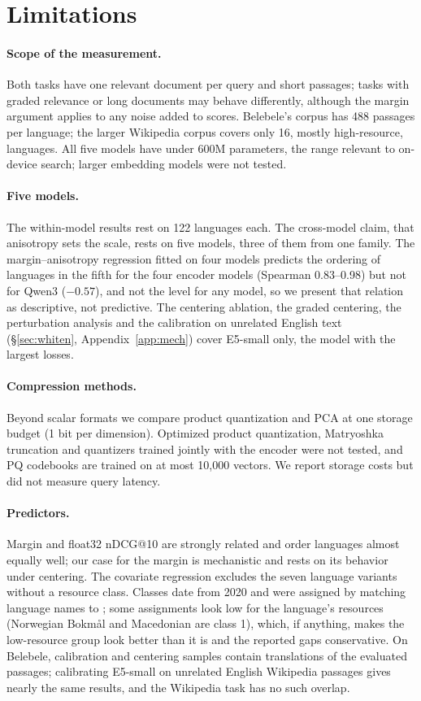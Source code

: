 \documentclass[11pt]{article}
\begin{document}
\section*{Limitations}
\paragraph{Scope of the measurement.} Both tasks have one relevant document per query and short passages; tasks with graded relevance or long documents may behave differently, although the margin argument applies to any noise added to scores. Belebele's corpus has 488 passages per language; the larger Wikipedia corpus covers only 16, mostly high-resource, languages. All five models have under 600M parameters, the range relevant to on-device search; larger embedding models were not tested.

\paragraph{Five models.} The within-model results rest on 122 languages each. The cross-model claim, that anisotropy sets the scale, rests on five models, three of them from one family. The margin--anisotropy regression fitted on four models predicts the ordering of languages in the fifth for the four encoder models (Spearman 0.83--0.98) but not for Qwen3 ($-0.57$), and not the level for any model, so we present that relation as descriptive, not predictive. The centering ablation, the graded centering, the perturbation analysis and the calibration on unrelated English text (\S\ref{sec:whiten}, Appendix~\ref{app:mech}) cover E5-small only, the model with the largest losses.

\paragraph{Compression methods.} Beyond scalar formats we compare product quantization and PCA at one storage budget (1 bit per dimension). Optimized product quantization, Matryoshka truncation and quantizers trained jointly with the encoder were not tested, and PQ codebooks are trained on at most 10{,}000 vectors. We report storage costs but did not measure query latency.

\paragraph{Predictors.} Margin and float32 nDCG@10 are strongly related and order languages almost equally well; our case for the margin is mechanistic and rests on its behavior under centering. The covariate regression excludes the seven language variants without a resource class. Classes date from 2020 and were assigned by matching language names to \citet{joshi2020state}; some assignments look low for the language's resources (Norwegian Bokm\aa l and Macedonian are class 1), which, if anything, makes the low-resource group look better than it is and the reported gaps conservative. On Belebele, calibration and centering samples contain translations of the evaluated passages; calibrating E5-small on unrelated English Wikipedia passages gives nearly the same results, and the Wikipedia task has no such overlap.
\end{document}
